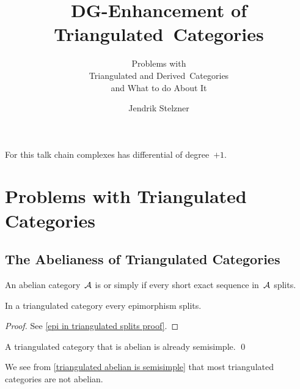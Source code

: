 \documentclass[a4paper,10pt]{scrartcl}
\title{DG-Enhancement of Triangulated~Categories}
\subtitle{Problems with \\ Triangulated and Derived~Categories \\ and What to do About It}
\author{Jendrik Stelzner}
\date{}
\begin{document}
\maketitle
  
\vspace{-1em}





For this talk chain complexes has differential of degree~$+1$.





\section{Problems with Triangulated Categories}



\subsection{The Abelianess of Triangulated Categories}

\begin{definition}
  An abelian category~$\mathcal{A}$ is  or simply  if every short exact sequence in~$\mathcal{A}$ splits.
\end{definition}

\begin{lemma}
  \label{epi in triangulated splits}
  In a triangulated category every epimorphism splits.
\end{lemma}

\begin{proof}
  See \cref{epi in triangulated splits proof}.
\end{proof}

\begin{corollary}
  \label{triangulated abelian is semisimple}
  A triangulated category that is abelian is already semisimple.
  \qed
\end{corollary}

We see from \cref{triangulated abelian is semisimple} that most triangulated categories are not abelian.
\end{document}
